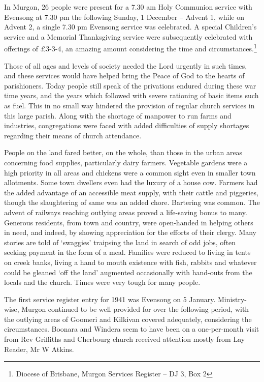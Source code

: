 In Murgon, 26 people were present for a 7.30 am Holy Communion service with Evensong at 7.30 pm the following Sunday, 1 December -- Advent 1, while on Advent 2, a single 7.30 pm Evensong service was celebrated. A special Children's service and a Memorial Thanksgiving service were subsequently celebrated with offerings of \pounds3-3-4, an amazing amount considering the time and circumstances.\footnote{Diocese of Brisbane, Murgon Services Register -- DJ 3, Box 2}


Those of all ages and levels of society needed the Lord urgently in such times, and these services would have helped bring the Peace of God to the hearts of parishioners. Today people still speak of the privations endured during these war time years, and the years which followed with severe rationing of basic items such as fuel. This in no small way hindered the provision of regular church services in this large parish. Along with the shortage of manpower to run farms and industries, congregations were faced with added difficulties of supply shortages regarding their means of church attendance.



People on the land fared better, on the whole, than those in the urban areas concerning food supplies, particularly dairy farmers. Vegetable gardens were a high priority in all areas and chickens were a common sight even in smaller town allotments. Some town dwellers even had the luxury of a house cow. Farmers had the added advantage of an accessible meat supply, with their cattle and piggeries, though the slaughtering of same was an added chore. Bartering was common. The advent of railways reaching outlying areas proved a life-saving bonus to many. Generous residents, from town and country, were open-handed in helping others in need, and indeed, by showing appreciation for the efforts of their clergy. Many stories are told of `swaggies' traipsing the land in search of odd jobs, often seeking payment in the form of a meal. Families were reduced to living in tents on creek banks, living a hand to mouth existence with fish, rabbits and whatever could be gleaned `off the land' augmented occasionally with hand-outs from the locals and the church. Times were very tough for many people.



The first service register entry for 1941 was Evensong on 5 January. Ministry-wise, Murgon continued to be well provided for over the following period, with the outlying areas of Goomeri and Kilkivan covered adequately, considering the circumstances. Boonara and Windera seem to have been on a one-per-month visit from Rev Griffiths and Cherbourg church received attention mostly from Lay Reader, Mr W Atkins.



